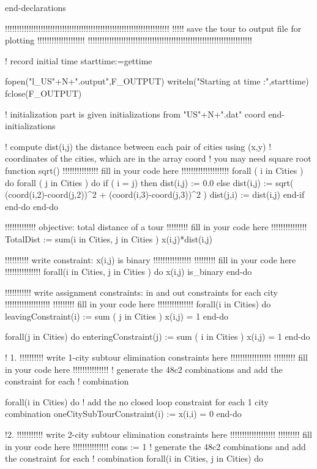 \documentclass[twoside,12pt]{article}
\begin{document}
\begin{verbatim*}
end-declarations

!!!!!!!!!!!!!!!!!!!!!!!!!!!!!!!!!!!!!!!!!!!!!!!!!!!!!!!!!!!!!!!!!!!!!
!!!!!  save the tour to output file for plotting !!!!!!!!!!!!!!!!!!!!
!!!!!!!!!!!!!!!!!!!!!!!!!!!!!!!!!!!!!!!!!!!!!!!!!!!!!!!!!!!!!!!!!!!!!

! record initial time
starttime:=gettime 

fopen("l_US"+N+".output",F_OUTPUT)
writeln("Starting at time :",starttime)
fclose(F_OUTPUT)

! initialization part is given 
initializations from "US"+N+".dat"
     coord
end-initializations

! compute dist(i,j) the distance between each pair of cities using (x,y) 
! coordinates of the cities, which are in the array coord
! you may need square root function sqrt()
!!!!!!!!!!!!!!! fill in your code here !!!!!!!!!!!!!!!!!!!! 
forall ( i in Cities ) do
	forall ( j in Cities ) do
		if ( i = j) then
			dist(i,j) := 0.0
		else
			dist(i,j) := sqrt( (coord(i,2)-coord(j,2))^2 + (coord(i,3)-coord(j,3))^2 )
			dist(j,i) := dist(i,j)
		end-if
	end-do
end-do

!!!!!!!!!!!!! objective: total distance of a tour
!!!!!!!!! fill in your code here !!!!!!!!!!!!!!!
TotalDist := sum(i in Cities, j in Cities ) x(i,j)*dist(i,j)

!!!!!!!!!! write constraint: x(i,j) is binary !!!!!!!!!!!!!!!!
!!!!!!!!! fill in your code here !!!!!!!!!!!!!!!
forall(i in Cities, j in Cities ) do
	x(i,j) is_binary
end-do

!!!!!!!!!!! write assignment constraints: in and out constraints for each city !!!!!!!!!!!!!!!!!!!
!!!!!!!!! fill in your code here !!!!!!!!!!!!!!!
forall(i in Cities) do
 leavingConstraint(i) := sum ( j in Cities ) x(i,j) = 1 
end-do

forall(j in Cities) do
 enteringConstraint(j) := sum ( i in Cities ) x(i,j) = 1 
end-do

! 1.
!!!!!!!!!! write 1-city subtour elimination constraints here !!!!!!!!!!!!!!!!!
!!!!!!!!! fill in your code here !!!!!!!!!!!!!!!
! generate the 48c2 combinations and add the constraint for each
! combination

forall(i in Cities) do
 ! add the no closed loop constraint for each 1 city combination
 oneCitySubTourConstraint(i) := x(i,i) = 0 
end-do


!2.
!!!!!!!!!!! write 2-city subtour elimination constraints here !!!!!!!!!!!!!!!!!!!
!!!!!!!!! fill in your code here !!!!!!!!!!!!!!!
cons := 1
! generate the 48c2 combinations and add the constraint for each
! combination
forall(i in Cities, j in Cities) do
 

\end{verbatim*}
\end{document}
